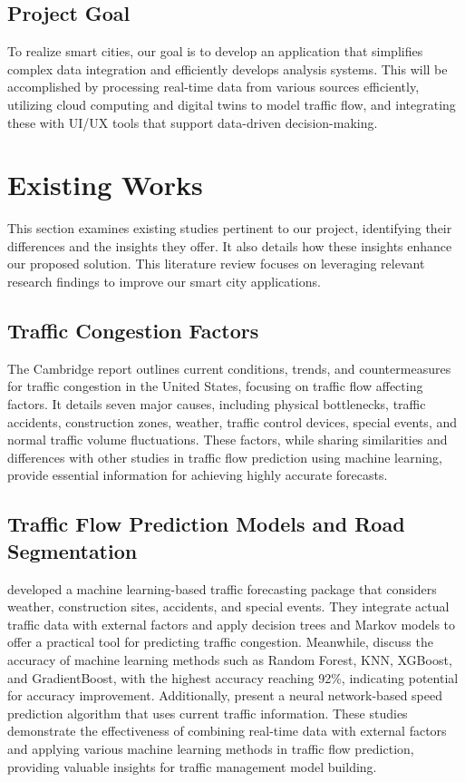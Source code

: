 \documentclass[12pt]{article}
\begin{document}
\subsection{Project Goal}
 To realize smart cities, our goal is to develop an application that simplifies complex data integration and efficiently develops analysis systems. This will be accomplished by processing real-time data from various sources efficiently, utilizing cloud computing and digital twins to model traffic flow, and integrating these with UI/UX tools that support data-driven decision-making.

\section{Existing Works}
 This section examines existing studies pertinent to our project, identifying their differences and the insights they offer. It also details how these insights enhance our proposed solution. This literature review focuses on leveraging relevant research findings to improve our smart city applications.
 
\subsection{Traffic Congestion Factors}
 The Cambridge \citet{systematics2005traffic} report outlines current conditions, trends, and countermeasures for traffic congestion in the United States, focusing on traffic flow affecting factors. It details seven major causes, including physical bottlenecks, traffic accidents, construction zones, weather, traffic control devices, special events, and normal traffic volume fluctuations. These factors, while sharing similarities and differences with other studies in traffic flow prediction using machine learning, provide essential information for achieving highly accurate forecasts.

\subsection{Traffic Flow Prediction Models and Road Segmentation}

 \citet{garrett2020integrated} developed a machine learning-based traffic forecasting package that considers weather, construction sites, accidents, and special events. They integrate actual traffic data with external factors and apply decision trees and Markov models to offer a practical tool for predicting traffic congestion. Meanwhile, \citet{zafar2020traffic} discuss the accuracy of machine learning methods such as Random Forest, KNN, XGBoost, and GradientBoost, with the highest accuracy reaching 92\%, indicating potential for accuracy improvement. Additionally, \citet{park2011real} present a neural network-based speed prediction algorithm that uses current traffic information. These studies demonstrate the effectiveness of combining real-time data with external factors and applying various machine learning methods in traffic flow prediction, providing valuable insights for traffic management model building.
\end{document}
